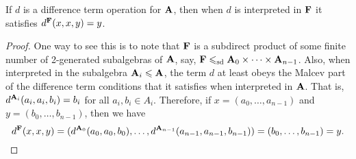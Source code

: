 \begin{lemma}
  If $d$ is a difference term operation for $\mathbf{A}$,
  then when $d$ is interpreted in $\mathbf{F}$ it satisfies $d^{\mathbf{F}}(x,x,y) = y$.
\end{lemma}
\begin{proof}
One way to see this is to note that $\mathbf{F}$ is a
  subdirect product of some finite number of 2-generated subalgebras of $\mathbf{A}$,
  say, $\mathbf{F} \leqslant_{\mathrm{sd}} \mathbf{A}_0 \times \cdots \times \mathbf{A}_{n-1}$. Also, when interpreted
  in the subalgebra $\mathbf{A}_i \leqslant \mathbf{A}$, the term $d$ at least obeys
  the Malcev part of the difference term conditions that it satisfies when
  interpreted in $\mathbf{A}$.
  That is,   $d^{\mathbf{A}_i}(a_i, a_i, b_i) = b_i$ for all $a_i, b_i \in A_i$.
  Therefore, if $x = (a_0, \dots, a_{n-1})$
  and $y = (b_0, \dots, b_{n-1})$, then we have
  \[d^{\mathbf{F}}(x,x,y) = 
  (d^{\mathbf{A}_0}(a_0, a_0, b_0), \dots,d^{\mathbf{A}_{n-1}}(a_{n-1}, a_{n-1}, b_{n-1}))
  = (b_0, \dots, b_{n-1}) = y.\]
\end{proof}




